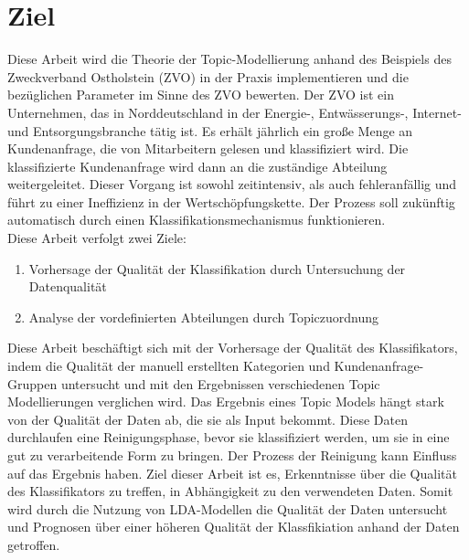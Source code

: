 \documentclass[german,version-2020-11]{uzl-thesis}
\begin{document}
\section{Ziel}
Diese Arbeit wird die Theorie der Topic-Modellierung anhand des Beispiels des Zweckverband Ostholstein (ZVO) in der Praxis implementieren und die bezüglichen Parameter im Sinne des ZVO bewerten. Der ZVO ist ein Unternehmen, das in Norddeutschland in der Energie-, Entwässerungs-, Internet- und Entsorgungsbranche tätig ist.  Es erhält jährlich ein große Menge an Kundenanfrage, die von Mitarbeitern gelesen und klassifiziert wird. Die klassifizierte Kundenanfrage wird dann an die zuständige Abteilung weitergeleitet. Dieser Vorgang ist sowohl zeitintensiv, als auch fehleranfällig und führt zu einer Ineffizienz in der Wertschöpfungskette. Der Prozess soll zukünftig automatisch durch einen Klassifikationsmechanismus funktionieren. \\
Diese Arbeit verfolgt zwei Ziele: 
\begin{enumerate}
\item Vorhersage der Qualität der Klassifikation durch Untersuchung der Datenqualität
\item Analyse der vordefinierten Abteilungen durch Topiczuordnung
\end{enumerate}

Diese Arbeit beschäftigt sich mit der Vorhersage der Qualität des Klassifikators, indem die Qualität der manuell erstellten Kategorien und Kundenanfrage-Gruppen untersucht und mit den Ergebnissen verschiedenen Topic Modellierungen verglichen wird. Das Ergebnis eines Topic Models hängt stark von der Qualität der Daten ab, die sie als Input bekommt. Diese Daten durchlaufen eine Reinigungsphase, bevor sie klassifiziert werden, um sie in eine gut zu verarbeitende Form zu bringen. Der Prozess der Reinigung kann Einfluss auf das Ergebnis haben. Ziel dieser Arbeit ist es, Erkenntnisse über die Qualität des Klassifikators zu treffen, in Abhängigkeit zu den verwendeten Daten. Somit wird durch die Nutzung von LDA-Modellen die Qualität der Daten untersucht und Prognosen über einer höheren Qualität der Klassfikiation anhand der Daten getroffen. 
\end{document}
